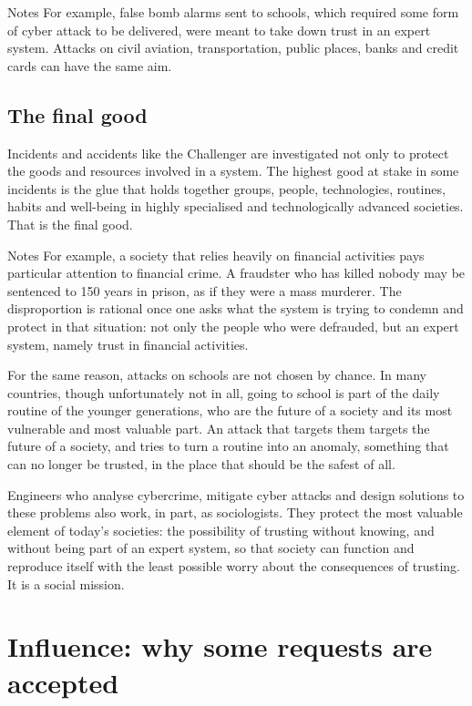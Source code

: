 \begin{nota}{Notes}
	For example, false bomb alarms sent to schools, which required some form of cyber attack to be delivered, were meant to take down trust in an expert system. Attacks on civil aviation, transportation, public places, banks and credit cards can have the same aim.
\end{nota}

\subsection{The final good}
Incidents and accidents like the Challenger are investigated not only to protect the goods and resources involved in a system. The highest good at stake in some incidents is the glue that holds together groups, people, technologies, routines, habits and well-being in highly specialised and technologically advanced societies. That is the final good.

\begin{nota}{Notes}
	For example, a society that relies heavily on financial activities pays particular attention to financial crime. A fraudster who has killed nobody may be sentenced to 150 years in prison, as if they were a mass murderer. The disproportion is rational once one asks what the system is trying to condemn and protect in that situation: not only the people who were defrauded, but an expert system, namely trust in financial activities.
\end{nota}

For the same reason, attacks on schools are not chosen by chance. In many countries, though unfortunately not in all, going to school is part of the daily routine of the younger generations, who are the future of a society and its most vulnerable and most valuable part. An attack that targets them targets the future of a society, and tries to turn a routine into an anomaly, something that can no longer be trusted, in the place that should be the safest of all.

Engineers who analyse cybercrime, mitigate cyber attacks and design solutions to these problems also work, in part, as sociologists. They protect the most valuable element of today's societies: the possibility of trusting without knowing, and without being part of an expert system, so that society can function and reproduce itself with the least possible worry about the consequences of trusting. It is a social mission.

\section{Influence: why some requests are accepted}

